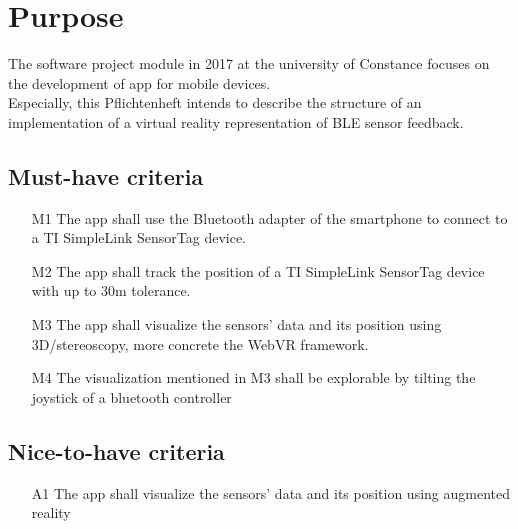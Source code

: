 \section{Purpose}
The software project module in 2017 at the university of Constance focuses on the development of app for mobile devices. \\
Especially, this Pflichtenheft intends to describe the structure of an implementation of a virtual reality representation of BLE sensor feedback.

\subsection{Must-have criteria}

\begin{itemize}
  \item[M1] The app shall use the Bluetooth adapter of the smartphone to connect to a TI SimpleLink SensorTag device.
  \item[M2] The app shall track the position of a TI SimpleLink SensorTag device with up to 30m tolerance.
  \item[M3] The app shall visualize the sensors' data and its position using 3D/stereoscopy, more concrete the WebVR framework.
  \item[M4] The visualization mentioned in M3 shall be explorable by tilting the joystick of a bluetooth controller
\end{itemize}

\subsection{Nice-to-have criteria}

\begin{itemize}
  \item[A1] The app shall visualize the sensors' data and its position using augmented reality
\end{itemize}
